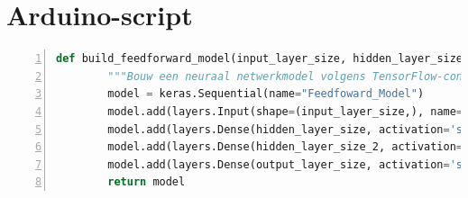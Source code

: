 \section{Arduino-script}
\begin{lstlisting}[language=Python, numbers=left, breaklines=true, basicstyle=\ttfamily\scriptsize]
    def build_feedforward_model(input_layer_size, hidden_layer_size, output_layer_size):
        """Bouw een neuraal netwerkmodel volgens TensorFlow-conventies."""
        model = keras.Sequential(name="Feedfoward_Model")
        model.add(layers.Input(shape=(input_layer_size,), name="Input_Layer"))
        model.add(layers.Dense(hidden_layer_size, activation='sigmoid', name="Hidden_Layer"))
        model.add(layers.Dense(hidden_layer_size_2, activation='sigmoid', name="Hidden_Layer_2"))
        model.add(layers.Dense(output_layer_size, activation='softmax', name="Output_Layer"))
        return model 
    \end{lstlisting}

